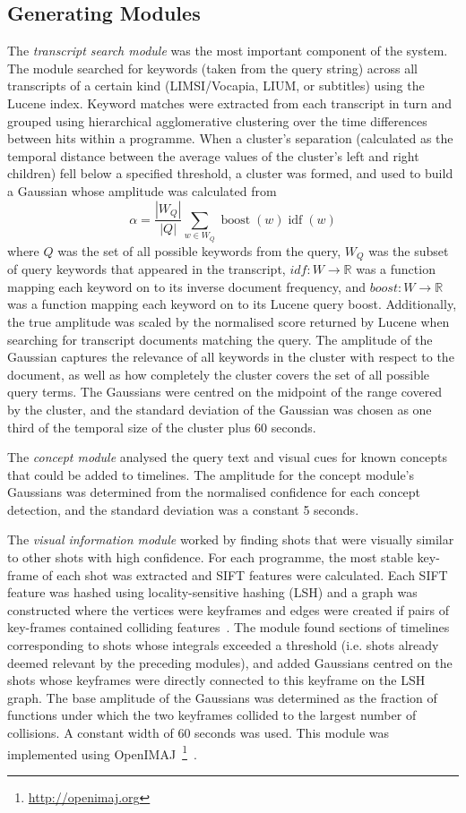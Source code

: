 \documentclass{../acm_proc_article-me11_tweaked}
\begin{document}
\subsection{Generating Modules}
The \emph{transcript search module} was the most important component of the system. The module searched for keywords (taken from the query string) 
across all transcripts of a certain kind (LIMSI/Vocapia, LIUM, or subtitles) using the Lucene index. Keyword matches were extracted from each transcript in turn and grouped using hierarchical agglomerative clustering over the time differences between hits within a programme. When a cluster's separation (calculated as the temporal distance between the average values of the cluster's left and right children) fell below a specified threshold, a cluster was formed, and used to build a Gaussian whose amplitude was calculated from \[\alpha = \frac{| W_Q |}{| Q |} \sum_{w \in W_Q} \operatorname{boost}(w) \operatorname{idf}(w)\] where \(Q\) was the set of all possible keywords from the query,
\(W_Q\) was the subset of query keywords that appeared in the transcript, 
 \(idf : W \to \mathbb{R}\) was a 
function mapping each keyword on to its inverse document frequency, and 
\(boost : W \to \mathbb{R}\) was a function mapping each keyword on to its 
Lucene query boost. Additionally, the true amplitude was scaled by the 
normalised score returned by Lucene when searching for transcript 
documents matching the query. The amplitude of the Gaussian captures the 
relevance of all keywords in the cluster with respect to the document, as well 
as how completely the cluster covers the set of all possible query terms. The 
Gaussians were centred on the midpoint of the range covered by the cluster, 
and the standard deviation of the Gaussian was chosen as one third of the 
temporal size of the cluster plus 60 seconds.

The \emph{concept module} analysed the query text and visual cues for known concepts that could be added to timelines. The amplitude for the concept 
module's Gaussians was determined from the normalised confidence for each 
concept detection, and the standard deviation was a constant 5 seconds. 

The \emph{visual information module} worked by finding shots that were 
visually similar to other shots with high confidence. For each programme, 
the most stable key-frame of each shot was extracted and SIFT features were 
calculated. Each SIFT feature was hashed using locality-sensitive hashing 
(LSH) and a graph was constructed where the vertices were keyframes and edges were created if pairs of key-frames contained colliding features~\cite{Hare:2013:TVP:2461466.2461514}. The module found sections of timelines corresponding to shots whose integrals exceeded a threshold (i.e. shots already deemed relevant by the preceding modules), and added Gaussians 
centred on the shots whose keyframes were directly connected to this keyframe 
on the LSH graph. The base amplitude of the Gaussians was determined as the 
fraction of functions under which the two keyframes collided to the largest 
number of collisions. A constant width of 60 seconds was used. This module was implemented using OpenIMAJ~\footnote{\url{http://openimaj.org}}~\cite{Hare:2011:OIJ:2072298.2072421}.
\end{document}
